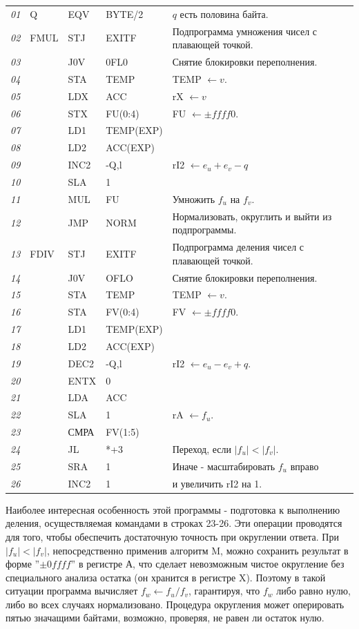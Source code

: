 {\begin{longtable}{l l l l l}
\textit{01} & Q & EQV & BYTE/2 & $q$ есть половина байта.\\
\textit{02} & FMUL & STJ & EXITF & Подпрограмма умножения чисел с плавающей точкой.\\
\textit{03} &  & J0V & 0FL0 & Снятие блокировки переполнения.\\
\textit{04} &  & STA & TEMP & TEMP $\leftarrow v$.\\
\textit{05} &  & LDX & ACC & rX $\leftarrow v$\\
\textit{06} &  & STX & FU(0:4) & FU $\leftarrow \pm f f f f 0$.\\
\textit{07} &  & LD1 & TEMP(EXP) &\\
\textit{08} &  & LD2 & ACC(EXP) &\\
\textit{09} &  & INC2 & -Q,l & rI2 $\leftarrow e_u + e_v - q$\\
\textit{10} &  & SLA & 1 &\\
\textit{11} &  & MUL & FU & Умножить $f_u$ на $f_v$.\\
\textit{12} &  & JMP & NORM & Нормализовать, округлить и выйти из подпрограммы.\\
\textit{13} & FDIV & STJ & EXITF & Подпрограмма деления чисел с плавающей точкой.\\
\textit{14} &  & J0V & OFLO & Снятие блокировки переполнения.\\
\textit{15} &  & STA & TEMP & TEMP $\leftarrow v$.\\
\textit{16} &  & STA & FV(0:4) & FV $\leftarrow \pm f f f f 0 $.\\
\textit{17} &  & LD1 & TEMP(EXP) &\\
\textit{18} &  & LD2 & ACC(EXP) &\\
\textit{19} &  & DEC2 & -Q,l & rI2 $\leftarrow e_u - e_v + q$.\\
\textit{20} &  & ENTX & 0 &\\
\textit{21} &  & LDA & ACC &\\
\textit{22} &  & SLA & 1 & rA $\leftarrow f_u$.\\
\textit{23} &  & СМРА & FV(1:5) &\\
\textit{24} &  & JL & *+3 & Переход, если $|f_u| < |f_v|$.\\
\textit{25} &  & SRA & 1 & Иначе - масштабировать $f_u$ вправо\\
\textit{26} &  & INC2 & 1 & и увеличить rI2 на 1.
\end{longtable}

Наиболее интересная особенность этой программы - подготовка к выполнению деления, осуществляемая командами в строках 23-26. Эти операции проводятся для того, чтобы обеспечить достаточную точность при округлении ответа. При $|f_u| < |f_v|$, непосредственно применив алгоритм M, можно сохранить результат в форме ''$\pm 0 f f f f$'' в регистре А, что сделает невозможным чистое округление без специального анализа остатка (он хранится в регистре X). Поэтому в такой ситуации программа вычисляет $f_w \leftarrow f_u / f_v$, гарантируя, что $f_w$ либо равно нулю, либо во всех случаях нормализовано. Процедура округления может оперировать пятью значащими байтами, возможно, проверяя, не равен ли остаток нулю.

}
